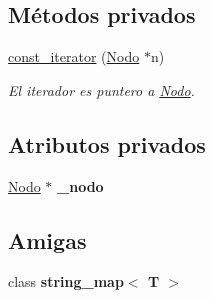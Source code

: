 \subsection*{Métodos privados}
\begin{DoxyCompactItemize}
\item 
\hypertarget{classstring__map_1_1const__iterator_a9e7b24c524e269c5e910615e77548f01}{\hyperlink{classstring__map_1_1const__iterator_a9e7b24c524e269c5e910615e77548f01}{const\-\_\-iterator} (\hyperlink{structstring__map_1_1Nodo}{Nodo} $\ast$n)}\label{classstring__map_1_1const__iterator_a9e7b24c524e269c5e910615e77548f01}

\begin{DoxyCompactList}\small\item\em El iterador es puntero a \hyperlink{structstring__map_1_1Nodo}{Nodo}. \end{DoxyCompactList}\end{DoxyCompactItemize}
\subsection*{Atributos privados}
\begin{DoxyCompactItemize}
\item 
\hypertarget{classstring__map_1_1const__iterator_a92196635e36d6acff25921951cf4a51a}{\hyperlink{structstring__map_1_1Nodo}{Nodo} $\ast$ {\bfseries \-\_\-nodo}}\label{classstring__map_1_1const__iterator_a92196635e36d6acff25921951cf4a51a}

\end{DoxyCompactItemize}
\subsection*{Amigas}
\begin{DoxyCompactItemize}
\item 
\hypertarget{classstring__map_1_1const__iterator_ad0a70c0d4333f3435a234a4682421708}{class {\bfseries string\-\_\-map$<$ T $>$}}\label{classstring__map_1_1const__iterator_ad0a70c0d4333f3435a234a4682421708}

\end{DoxyCompactItemize}



